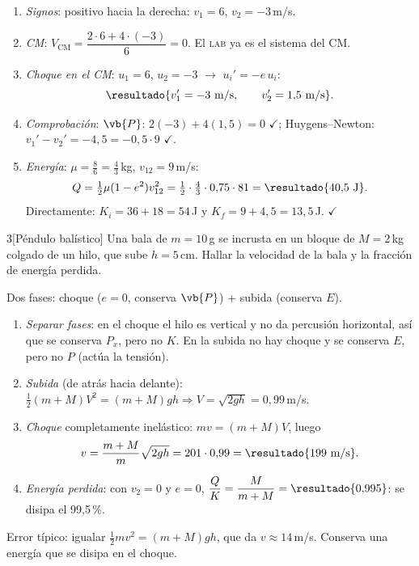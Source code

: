 \documentclass[11pt,a4paper,twoside]{article}
\newcommand{\cm}{_{\mathrm{CM}}}
\newcommand{\lab}{\textup{\textsc{lab}}}
\newcommand{\ok}{\textcolor{verde}{$\checkmark$}}
\newcommand{\metodo}[1]{{\color{tenue}\small\sffamily #1}\par\nopagebreak}
\begin{document}
\begin{resolucion}
\begin{enumerate}
  \item \emph{Signos}: positivo hacia la derecha: $v_{1}=6$, $v_{2}=-3$\,m/s.
  \item \emph{CM}: $V\cm=\dfrac{2\cdot6+4\cdot(-3)}{6}=0$. El \lab{} ya es el sistema del CM.
  \item \emph{Choque en el CM}: $u_{1}=6$, $u_{2}=-3$ $\to$ $u_{i}'=-e\,u_{i}$:
        \[
          \resultado{v_{1}'=-3\text{ m/s},\qquad v_{2}'=1{,}5\text{ m/s}} .
        \]
  \item \emph{Comprobación}: $\vb{P}$: $2(-3)+4(1{,}5)=0$ \ok{}; Huygens--Newton: $v_{1}'-v_{2}'=-4{,}5=-0{,}5\cdot9$ \ok{}.
  \item \emph{Energía}: $\mu=\frac{8}{6}=\frac43$\,kg, $v_{12}=9$\,m/s:
        \[
          Q=\tfrac12\mu(1-e^{2})v_{12}^{2}=\tfrac12\cdot\tfrac43\cdot0{,}75\cdot81=\resultado{40{,}5\text{ J}} .
        \]
        Directamente: $K_{i}=36+18=54$\,J y $K_{f}=9+4{,}5=13{,}5$\,J. \ok{}
\end{enumerate}
\end{resolucion}

\begin{problema}{3}[Péndulo balístico]
Una bala de $m=10$\,g se incrusta en un bloque de $M=2$\,kg colgado de un hilo, que sube
$h=5$\,cm. Hallar la velocidad de la bala y la fracción de energía perdida.
\end{problema}
\metodo{Dos fases: choque ($e=0$, conserva $\vb{P}$) + subida (conserva $E$).}

\begin{resolucion}
\begin{enumerate}
  \item \emph{Separar fases}: en el choque el hilo es vertical y no da percusión horizontal, así que se
        conserva $P_{x}$, pero no $K$. En la subida no hay choque y se conserva $E$, pero no $P$ (actúa la tensión).
  \item \emph{Subida} (de atrás hacia delante): $\tfrac12(m+M)V^{2}=(m+M)gh\Rightarrow V=\sqrt{2gh}=0{,}99$\,m/s.
  \item \emph{Choque} completamente inelástico: $mv=(m+M)V$, luego
        \[
          v=\frac{m+M}{m}\sqrt{2gh}=201\cdot0{,}99=\resultado{199\text{ m/s}} .
        \]
  \item \emph{Energía perdida}: con $v_{2}=0$ y $e=0$, $\dfrac{Q}{K}=\dfrac{M}{m+M}=\resultado{0{,}995}$: se disipa el 99,5\,\%.
\end{enumerate}
Error típico: igualar $\tfrac12mv^{2}=(m+M)gh$, que da $v\approx14$\,m/s. Conserva una energía que se disipa en el choque.
\end{resolucion}
\end{document}
